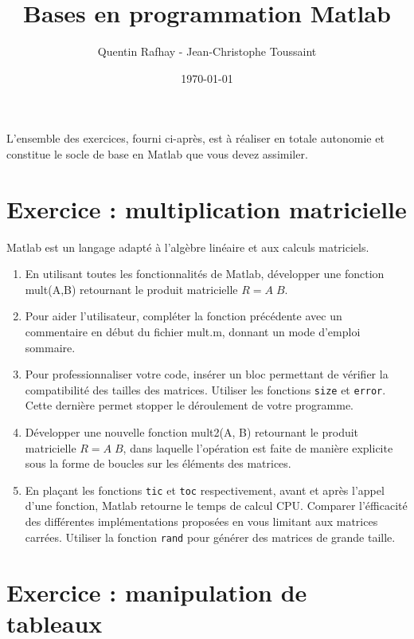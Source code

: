 \documentclass[a4paper, 12pt]{article}
\begin{document}


\title{Bases en programmation Matlab}

\author{Quentin Rafhay - Jean-Christophe Toussaint\\
}
\date{\today}
 
\maketitle


L'ensemble des exercices, fourni ci-après, est à réaliser en totale autonomie et constitue le socle
de base en Matlab que vous devez assimiler.

\section{Exercice : multiplication matricielle}

Matlab est un langage adapté à l'algèbre linéaire et aux calculs matriciels.

\begin{enumerate} 
 \item En utilisant toutes les fonctionnalités de Matlab, développer une fonction mult(A,B)
retournant le produit matricielle $R=A\;B$. 
\item Pour aider l'utilisateur, compléter la fonction précédente avec un commentaire
en début du fichier mult.m, donnant un mode d'emploi sommaire.
\item Pour professionnaliser votre code, insérer un bloc permettant de vérifier la compatibilité
des tailles des matrices. Utiliser les fonctions {\tt size} et {\tt error}. Cette dernière permet stopper 
le déroulement de votre programme.
\item Développer une nouvelle fonction  mult2(A, B) retournant le produit matricielle $R=A\;B$, dans laquelle
l'opération est faite de manière explicite sous la forme de boucles sur les éléments des matrices.
\item En plaçant les fonctions {\tt tic} et {\tt toc} respectivement, avant et après l'appel d'une fonction, Matlab
retourne le temps de calcul CPU. Comparer l'éfficacité des différentes implémentations proposées
en vous limitant aux matrices carrées.
Utiliser la fonction {\tt rand} pour générer des matrices de grande taille. 
\end{enumerate} 

\section{Exercice : manipulation de tableaux}
\end{document}
